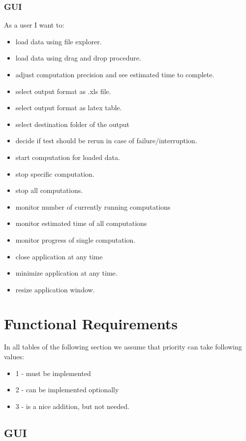 \documentclass{article}
\begin{document}
\subsubsection{GUI}
As a user I want to:
\begin{itemize}
	\item
		load data using file explorer.
	\item
		load data using drag and drop procedure.
	\item
		adjust computation precision and see estimated time to complete.
	\item
		select output format as .xls file.
	\item
		select output format as latex table.
	\item
		select destination folder of the output
	\item
		decide if test should be rerun in case of failure/interruption.
	\item 
		start computation for loaded data.
	\item
		stop specific computation.
	\item
		stop all computations.
	\item 
		monitor number of currently running computations
	\item
		monitor estimated time of all computations
	\item
		monitor progress of single computation.
	\item
		close application at any time
	\item
		minimize application at any time.
	\item 
		resize application window.
\end{itemize}


	

\newpage

\section{Functional Requirements}
In all tables of the following section we assume that priority can take following values:
\begin{itemize} 
\item 1 - must be implemented
\item 2 - can be implemented optionally 
\item 3 - is a nice addition, but not needed.
\end{itemize} 

\subsection{GUI}
\end{document}
